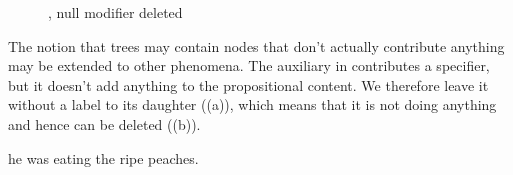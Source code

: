 \documentclass[11pt,a4paper]{article}
\begin{document}
\newpage
\begin{figure}[ht]
\caption{, null modifier deleted}\label{he eats the ripe peaches .'}
\end{figure}

\noindent
The notion that trees may contain nodes that don't actually contribute
anything may be extended to other phenomena. The auxiliary in
 contributes a specifier, but it doesn't add anything to the
propositional content. We therefore leave it without a label to its
daughter ((a)), which means that it is not doing anything and hence can be
deleted ((b)).

\begin{examples}
\item \label{WAS} he was eating the ripe peaches.
\end{examples}
\end{document}
